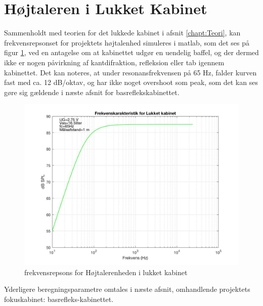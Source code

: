\section{Højtaleren i Lukket Kabinet}

Sammenholdt med teorien for det lukkede kabinet i afsnit \ref{chapt:Teori}, kan frekvensrepsonset for projektets højtalenhed simuleres i matlab, som det ses på figur \ref{fig:simLukketKab}, ved en antagelse om at kabinettet udgør en uendelig baffel, og der dermed ikke er nogen påvirkning af kantdifraktion, refleksion eller tab igennem kabinettet.  
Det kan noteres, at under resonansfrekvensen på 65 Hz, falder kurven fast med ca. 12 dB/oktav, og har ikke noget overshoot som peak, som det kan ses gøre sig gældende i næste afsnit for basreflekskabinettet. 


\begin{figure}[h!]
	\centering
	\includegraphics[width=.8\textwidth]{Pics/simLukketKab}
	\caption{frekvensrepsons for Højtalerenheden i lukket kabinet } 
	\label{fig:simLukketKab}
\end{figure}

Yderligere beregningsparametre omtales i næste afsnit, omhandlende projektets fokuskabinet: basrefleks-kabinettet. 


